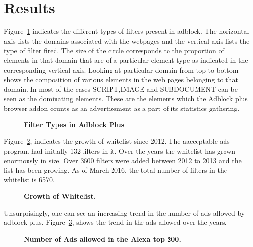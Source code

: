\section{Results}
Figure~\ref{fig:abp-filters} indicates the different types of filters  present in adblock.
The horizontal axis lists the domains associated with the webpages and the vertical axis lists the type of filter fired. The size of the circle corresponds to  the proportion of elements in that domain that are of a particular element type as indicated in the corresponding vertical axis. Looking at  particular domain from top to bottom shows the composition of various elements in the web pages belonging to that domain. In most of the cases  SCRIPT,IMAGE and SUBDOCUMENT can be seen as the dominating elements. These are the elements which the Adblock plus browser addon counts as an advertisement as a part of its statistics gathering.
\begin{figure}[h]
	\centering
	\vspace*{-0.5cm}
	\caption{\textbf{Filter Types in Adblock Plus}}
	\label{fig:abp-filters}
	\vspace*{-0.5cm}
\end{figure}

Figure~\ref{fig:growth}, indicates the growth of whitelist since 2012. The aacceptable ads program had initially 132 filters in it. Over the years the whitelist has grown enormously in  size.  Over 3600 filters were added  between 2012 to 2013 and the list has been growing. As of March 2016, the total number of  filters in the whitelist is 6570.
\begin{figure}[p]
	\centering
	\vspace*{-0.5cm}
	\caption{\textbf{Growth of Whitelist.}}
	\label{fig:growth}
	\vspace*{-0.5cm}
\end{figure}

Unsurprisingly, one can see an increasing trend in the number of ads allowed by adblock plus.
Figure~\ref{fig:ads-allowed}, shows the trend in the ads allowed over the years.
\begin{figure}[p]
	\centering
	\vspace*{-0.5cm}
	\caption{\textbf{Number of Ads allowed in the Alexa top 200.}}
	\label{fig:ads-allowed}
	\vspace*{-0.5cm}
\end{figure}

